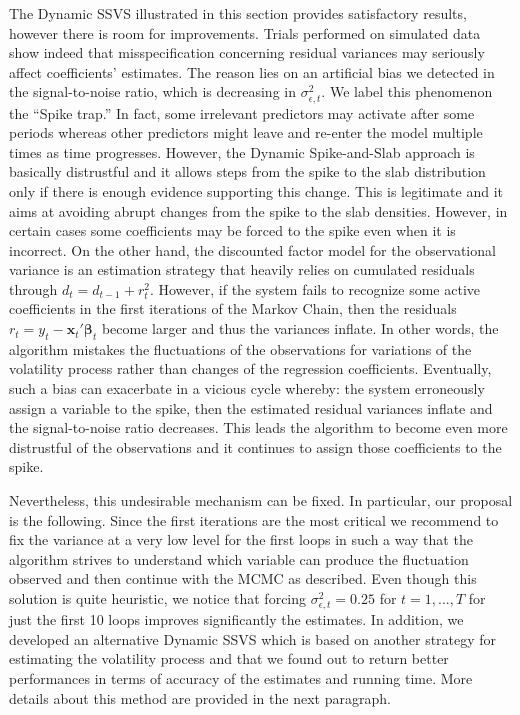 \documentclass[
  12pt,
]{book}
\theoremstyle{break}
\theoremstyle{nonumberplain}
\begin{document}
The Dynamic SSVS illustrated in this section provides satisfactory
results, however there is room for improvements. Trials performed on
simulated data show indeed that misspecification concerning residual
variances may seriously affect coefficients' estimates. The reason lies
on an artificial bias we detected in the signal-to-noise ratio, which is
decreasing in \(\sigma^{2}_{\epsilon,t}\). We label this phenomenon the
``Spike trap.'' In fact, some irrelevant predictors may activate after
some periods whereas other predictors might leave and re-enter the model
multiple times as time progresses. However, the Dynamic Spike-and-Slab
approach is basically distrustful and it allows steps from the spike to
the slab distribution only if there is enough evidence supporting this
change. This is legitimate and it aims at avoiding abrupt changes from
the spike to the slab densities. However, in certain cases some
coefficients may be forced to the spike even when it is incorrect. On
the other hand, the discounted factor model for the observational
variance is an estimation strategy that heavily relies on cumulated
residuals through \(d_{t}=d_{t-1}+r_{t}^{2}\). However, if the system
fails to recognize some active coefficients in the first iterations of
the Markov Chain, then the residuals
\(r_{t}=y_{t}-\boldsymbol{x}_{t}'\boldsymbol{\beta}_{t}\) become larger
and thus the variances inflate. In other words, the algorithm mistakes
the fluctuations of the observations for variations of the volatility
process rather than changes of the regression coefficients. Eventually,
such a bias can exacerbate in a vicious cycle whereby: the system
erroneously assign a variable to the spike, then the estimated residual
variances inflate and the signal-to-noise ratio decreases. This leads
the algorithm to become even more distrustful of the observations and it
continues to assign those coefficients to the spike.

Nevertheless, this undesirable mechanism can be fixed. In particular,
our proposal is the following. Since the first iterations are the most
critical we recommend to fix the variance at a very low level for the
first loops in such a way that the algorithm strives to understand which
variable can produce the fluctuation observed and then continue with the
MCMC as described. Even though this solution is quite heuristic, we
notice that forcing \(\sigma^{2}_{\epsilon,t}=0.25\) for \(t=1,...,T\)
for just the first 10 loops improves significantly the estimates. In
addition, we developed an alternative Dynamic SSVS which is based on
another strategy for estimating the volatility process and that we found
out to return better performances in terms of accuracy of the estimates
and running time. More details about this method are provided in the
next paragraph.
\end{document}
